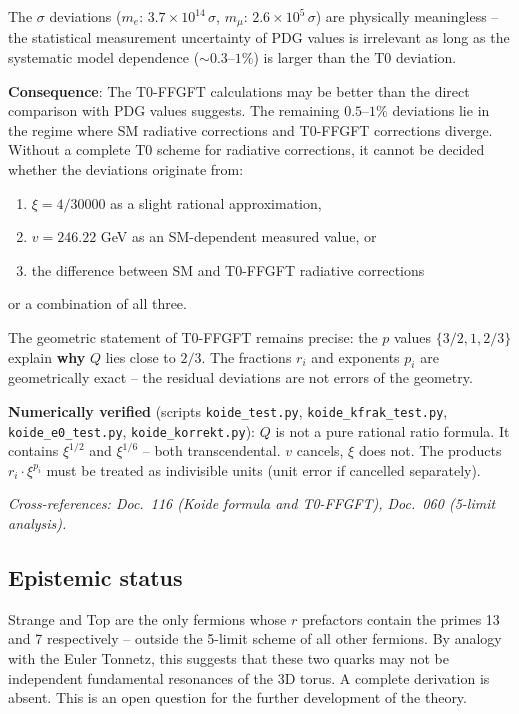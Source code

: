 The $\sigma$ deviations ($m_e$: $3.7 \times 10^{14}\,\sigma$,
$m_\mu$: $2.6 \times 10^5\,\sigma$) are physically meaningless
-- the statistical measurement uncertainty of PDG values is irrelevant
as long as the systematic model dependence ($\sim 0.3$--$1\%$) is
larger than the T0 deviation.

\textbf{Consequence}: The T0-FFGFT calculations may be better than
the direct comparison with PDG values suggests. The remaining $0.5$--$1\%$
deviations lie in the regime where SM radiative corrections and
T0-FFGFT corrections diverge. Without a complete T0 scheme for
radiative corrections, it cannot be decided whether the deviations
originate from:
\begin{enumerate}
    \item $\xi = 4/30000$ as a slight rational approximation,
    \item $v = 246.22$ GeV as an SM-dependent measured value, or
    \item the difference between SM and T0-FFGFT radiative corrections
\end{enumerate}
or a combination of all three.

The geometric statement of T0-FFGFT remains precise:
the $p$ values $\{3/2, 1, 2/3\}$ explain \textbf{why} $Q$ lies
close to $2/3$. The fractions $r_i$ and exponents $p_i$ are
geometrically exact -- the residual deviations are not errors
of the geometry.

\textbf{Numerically verified} (scripts \texttt{koide\_test.py},
\texttt{koide\_kfrak\_test.py}, \texttt{koide\_e0\_test.py},
\texttt{koide\_korrekt.py}):
$Q$ is not a pure rational ratio formula. It contains
$\xi^{1/2}$ and $\xi^{1/6}$ -- both transcendental. $v$ cancels,
$\xi$ does not. The products $r_i \cdot \xi^{p_i}$ must be treated
as indivisible units (unit error if cancelled separately).

\noindent\textit{Cross-references: Doc.~116 (Koide formula and T0-FFGFT),
Doc.~060 (5-limit analysis).}

\subsection{Epistemic status}

\begin{predbox}
Strange and Top are the only fermions whose $r$ prefactors contain
the primes 13 and 7 respectively -- outside the 5-limit scheme of
all other fermions. By analogy with the Euler Tonnetz, this suggests
that these two quarks may not be independent fundamental resonances
of the 3D torus. A complete derivation is absent. This is an open
question for the further development of the theory.
\end{predbox}


